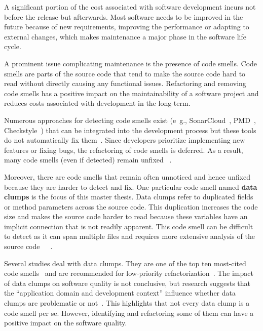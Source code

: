 \label{sec:introduction}

A significant portion of the cost associated with software development incurs not before the release but afterwards. Most software needs to be improved in the future because of new requirements, improving the performance or adapting to external changes, which makes maintenance a major phase in the  software life cycle.~\cite{465272}


A prominent issue  complicating maintenance is the presence of code smells. Code smells are parts of the source code that tend to make the source code hard to read without directly causing any functional issues. Refactoring and removing code smells has a positive impact on the maintainability  of a software project and reduces costs associated with development in the long-term.~\cite{mealyEvaluatingSoftwareRefactoring2006}



Numerous approaches for detecting code smells exist (e~g., SonarCloud~\cite{sonarcloud},  PMD~\cite{pmd}, Checkstyle~\cite{checkstyle}) that can be integrated into the development process but these tools do not automatically fix them~\cite{vidalApproachPrioritizeCode2016}. Since developers prioritize implementing new features or fixing bugs, the refactoring of code smells is deferred. As a result, many code smells (even if detected) remain unfixed  ~\cite{10.1145/2393596.2393655}.

Moreover, there are code smells that remain often unnoticed and hence unfixed because they are harder to detect and fix. One particular code smell named \textbf{data clumps} is the focus of this master thesis. Data clumps refer to duplicated fields or method parameters across the source code. This duplication increases the code size and makes the source code harder to read because these variables have an implicit connection that is not readily apparent.  This code smell can be difficult to detect as it can span multiple files and requires more extensive analysis of the source code~\cite{BaumgartnerAP23}~\cite{data_clumps_refactoring_guru}~\cite{join_data_items}.
 
Several studies deal with data clumps. They are one of the top ten most-cited code smells~\cite{lacerda} and are recommended for low-priority refactorization~\cite{zhangPrioritisingRefactoringUsing2011}. The impact of data clumps on software quality is not conclusive, but research suggests that the \enquote{application domain and development context} influence whether data clumps are problematic or not~\cite{hallCodeSmellsHave2014}. This highlights that not every data clump is a code smell per se. However,  identifying and refactoring some of them can have a positive impact on the software quality. 

